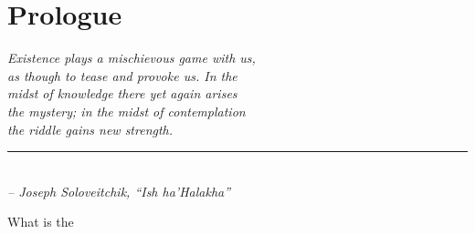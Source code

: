 \chapter*{Prologue}


\begin{flushleft}
	\textsl{Existence plays a mischievous game with us,}\\
	\textsl{as though to tease and provoke us. In the }\\
	\textsl{midst of knowledge there yet again arises }\\
	\textsl{the mystery; in the midst of contemplation}\\
	\textsl{the riddle gains new strength.}\\
	\rule[0pt]{19.5em}{0.5pt}\\
	\textsl{-- Joseph Soloveitchik, ``Ish ha'Halakha''}
\end{flushleft}

\vspace{2em}

What is the 
%
%
%
